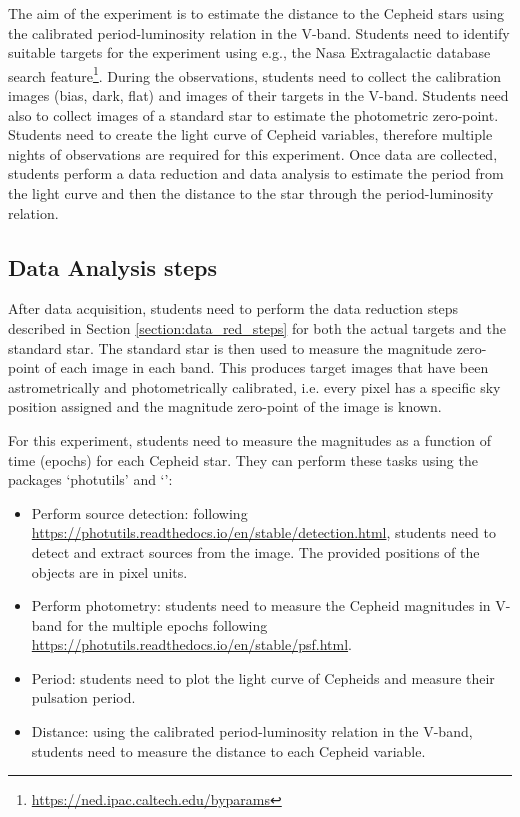 \documentclass[a4paper, 11pt, fleqn]{memoir}
\begin{document}
The aim of the experiment is to estimate the distance to the Cepheid stars using the calibrated period-luminosity relation in the V-band.
Students need to identify suitable targets for the experiment using e.g., the Nasa Extragalactic database search feature\footnote{\url{https://ned.ipac.caltech.edu/byparams}}.
During the observations, students need to collect the calibration images (bias, dark, flat) and images of their targets in the V-band.
Students need also to collect images of a standard star to estimate the photometric zero-point.
Students need to create the light curve of Cepheid variables, therefore multiple nights of observations are required for this experiment.
Once data are collected, students perform a data reduction and data analysis to estimate the period from the light curve and then the distance to the star through the period-luminosity relation.

\subsection{Data Analysis steps}

After data acquisition, students need to perform the data reduction steps described in Section \ref{section:data_red_steps} for both the actual targets and the standard star.
The standard star is then used to measure the magnitude zero-point of each image in each band.
This produces target images that have been astrometrically and photometrically calibrated, i.e. every pixel has a specific sky position assigned and the magnitude zero-point of the image is known.

For this experiment, students need to measure the magnitudes as a function of time (epochs) for each Cepheid star.
They can perform these tasks using the  packages `photutils' and `':
\begin{itemize}
    \item Perform source detection: following \url{https://photutils.readthedocs.io/en/stable/detection.html}, students need to detect and extract sources from the image.
          The provided positions of the objects are in pixel units.
    \item
          Perform photometry: students need to measure the Cepheid magnitudes in V-band
          for the multiple epochs following
          \url{https://photutils.readthedocs.io/en/stable/psf.html}.
    \item
          Period: students need to plot the light curve of Cepheids and measure their
          pulsation period.
    \item
          Distance: using the calibrated period-luminosity relation in the V-band,
          students need to measure the distance to each Cepheid variable.
\end{itemize}
\end{document}
